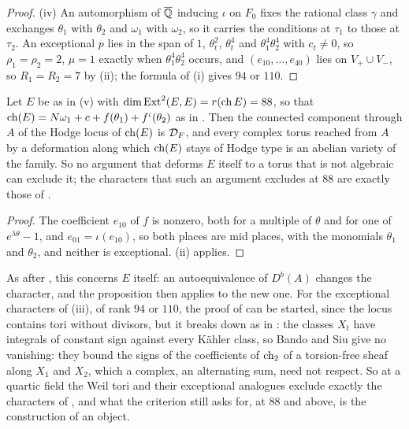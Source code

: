 \begin{proof}
(iv) An automorphism of $\overline{\mathbb{Q}}$ inducing $\iota$ on $F_{0}$ fixes the
rational class $\gamma$ and exchanges $\theta_{1}$ with $\theta_{2}$ and
$\omega_{1}$ with $\omega_{2}$, so it carries the conditions at $\tau_{1}$ to
those at $\tau_{2}$. An exceptional $p$ lies in the span of $1$,
$\theta_{t}^{2}$, $\theta_{t}^{4}$ and $\theta_{1}^{4}\theta_{2}^{4}$ with
$c_{t}\ne0$, so $\rho_{1}=\rho_{2}=2$, $\mu=1$ exactly when
$\theta_{1}^{4}\theta_{2}^{4}$ occurs, and $(e_{10},\dots,e_{40})$ lies on
$V_{+}\cup V_{-}$, so $R_{1}=R_{2}=7$ by (ii); the
formula of (i) gives $94$ or $110$.
\end{proof}

\begin{corollary}\label{cor:quarticlocus}
Let $E$ be as in \textup{(v)} with
$\dim\operatorname{Ext}^{2}(E,E)=r(\operatorname{ch} E)=88$, so that $\operatorname{ch}(E)=N\omega_{1}+c+f(\theta_{1})
+f^{\iota}(\theta_{2})$ as in . Then the connected
component through $A$ of the Hodge locus of $\operatorname{ch}(E)$ is $\mathcal{D}_{F}$, and every
complex torus reached from $A$ by a deformation along which $\operatorname{ch}(E)$ stays of
Hodge type is an abelian variety of the family. So no argument that deforms
$E$ itself to a torus that is not algebraic can exclude it; the characters
that such an argument excludes at $88$ are exactly those of
.
\end{corollary}

\begin{proof}
The coefficient $e_{10}$ of $f$ is nonzero, both for a multiple of $\theta$
and for one of $e^{\lambda\theta}-1$, and $e_{01}=\iota(e_{10})$, so both
places are mid places, with the monomials $\theta_{1}$ and $\theta_{2}$, and
neither is exceptional. (ii) applies.
\end{proof}

As after , this concerns $E$ itself: an
autoequivalence of $D^{b}(A)$ changes the character, and the proposition then
applies to the new one. For the exceptional characters of
(iii), of rank $94$ or $110$, the proof of
 can be started, since the locus contains tori without
divisors, but it breaks down as in : the classes
$X_{t}$ have integrals of constant sign against every K\"ahler class, so
Bando and Siu give no vanishing: they bound the signs of the coefficients of
$\operatorname{ch}_{2}$ of a torsion-free sheaf along $X_{1}$ and $X_{2}$, which a complex,
an alternating sum, need not respect. So at a
quartic field the Weil tori and their exceptional analogues exclude exactly
the characters of , and what the criterion still
asks for, at $88$ and above, is the construction of an object.

